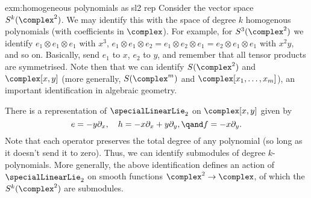 \documentclass[fleqn]{NotesClass}
\begin{document}
    \begin{exm}{}{exm:homogeneous polynomials as sl2 rep}
        Consider the vector space \(S^k(\complex^2)\).
        We may identify this with the space of degree \(k\) homogenous polynomials (with coefficients in \(\complex\)).
        For example, for \(S^3(\complex^2)\) we identify \(e_1 \otimes e_1 \otimes e_1\) with \(x^3\), \(e_1 \otimes e_1 \otimes e_2 = e_1 \otimes e_2 \otimes e_1 = e_2 \otimes e_1 \otimes e_1\) with \(x^2y\), and so on.
        Basically, send \(e_1\) to \(x\), \(e_2\) to \(y\), and remember that all tensor products are symmetrised.
        Note then that we can identify \(S(\complex^2)\) and \(\complex[x, y]\) (more generally, \(S(\complex^m)\) and \(\complex[x_1, \dotsc, x_m]\)), an important identification in algebraic geometry.
        
        There is a representation of \(\specialLinearLie_2\) on \(\complex[x, y]\) given by
        \begin{equation}
            e = -y\partial_x, \quad h = -x \partial_x + y \partial_y, \qand f = -x\partial_y.
        \end{equation}
        Note that each operator preserves the total degree of any polynomial (so long as it doesn't send it to zero).
        Thus, we can identify submodules of degree \(k\)-polynomials.
        More generally, the above identification defines an action of \(\specialLinearLie_2\) on smooth functions \(\complex^2 \to \complex\), of which the \(S^k(\complex^2)\) are submodules.
        

\end{exm}
\end{document}
